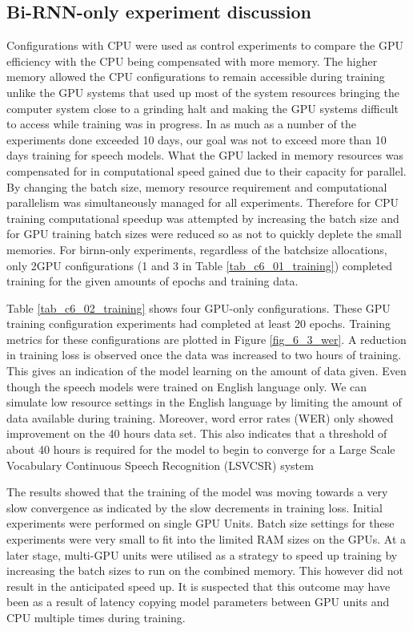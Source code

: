 {\subsection{Bi-RNN-only experiment discussion}
Configurations with CPU were used as control experiments to compare the GPU efficiency with the CPU being compensated with more memory.  The higher memory allowed the CPU configurations to remain accessible during training unlike the GPU systems that used up most of the system resources bringing the computer system close to a grinding halt and making the GPU systems difficult to access while training was in progress.  In as much as a number of the experiments done exceeded 10 days, our goal was not to exceed more than 10 days training for speech models.  What the GPU lacked in memory resources was compensated for in computational speed gained due to their capacity for parallel.  By changing the batch size, memory resource requirement and computational parallelism was simultaneously managed for all experiments.  Therefore for CPU training computational speedup was attempted by increasing the batch size and for GPU training batch sizes were reduced so as not to quickly deplete the small memories.  For \acrshort{birnn}-only experiments, regardless of the batchsize allocations, only 2GPU configurations  (1 and 3 in Table \ref{tab_c6_01_training}) completed training for the given amounts of epochs and training data.

Table \ref{tab_c6_02_training} shows four GPU-only configurations.  These GPU training configuration experiments had completed at least 20 epochs.  Training metrics for these configurations are plotted in Figure \ref{fig_6_3_wer}.   A reduction in training loss is observed once the data was increased to two hours of training.  This gives an indication of the model learning on the amount of data given.  Even though the speech models were trained on English language only.  We can simulate low resource settings in the English language by limiting the amount of data available during training.  Moreover, word error rates (WER) only showed improvement on the 40 hours data set.  This also indicates that a threshold of about 40 hours is required for the model to begin to converge for a Large Scale Vocabulary Continuous Speech Recognition (LSVCSR) system

The results showed that the training of the model was moving towards a very slow convergence as indicated by the slow decrements in training loss.  Initial experiments were performed on single GPU Units.  Batch size settings for these experiments were very small to fit into the limited RAM sizes on the GPUs.  At a later stage, multi-GPU units were utilised as a strategy to speed up training by increasing the batch sizes to run on the combined memory.  This however did not result in the anticipated speed up. It is suspected that this outcome may have been as a result of latency copying model parameters between GPU units and CPU multiple times during training.

}
